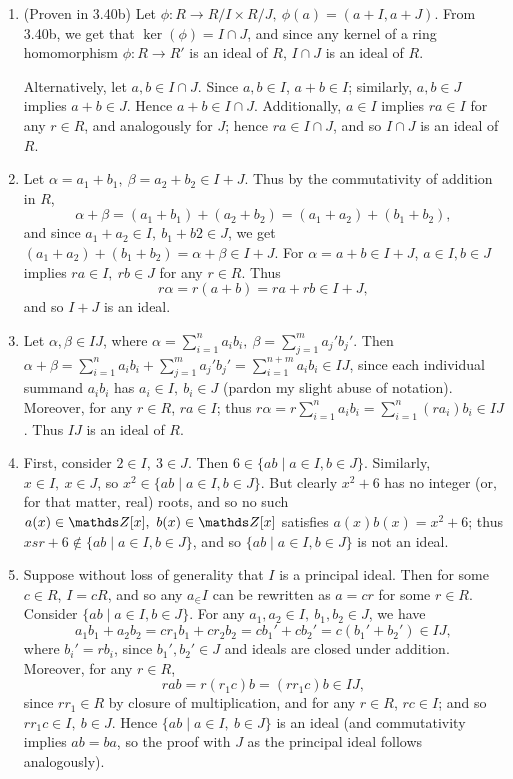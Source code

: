\documentclass{homework}
\begin{document}
\begin{solution}
  \begin{enumerate}[label=(\alph*)]
    \item (Proven in 3.40b) Let $\phi:R\to R / I \times  R / J,\ \phi(a)=(a+I,a+J)$. From 3.40b, we
      get that $\ker(\phi)=I\cap J$, and since any kernel of a ring homomorphism $\phi:R\to R'$ is
      an ideal of $R$, $I\cap J$ is an ideal of $R$.

      Alternatively, let $a,b\in I\cap J$. Since $a,b\in I$, $a+b\in I$; similarly, $a,b\in J$
      implies $a+b\in J$. Hence $a+b\in I\cap J$. Additionally, $a\in I$ implies $ra\in I$ for any
      $r\in R$, and analogously for $J$; hence $ra\in I\cap J$, and so $I\cap J$ is an ideal of $R$.

    \item Let $\alpha=a_1+b_1,\ \beta=a_2+b_2\in I+J$. Thus by the commutativity of addition in $R$,
      \[
        \alpha+\beta=(a_1+b_1)+(a_2+b_2)=(a_1+a_2)+(b_1+b_2)
      ,\] and since $a_1+a_2\in I,\ b_1+b2\in J$, we get $(a_1+a_2)+(b_1+b_2)=\alpha+\beta\in I+J$.
      For $\alpha=a+b\in I+J$, $a\in I, b\in J$ implies $ra\in I,\ rb\in J$ for any $r\in R$. Thus \[
        r\alpha=r(a+b)=ra+rb\in I+J
      ,\] and so $I+J$ is an ideal.

    \item Let $\alpha,\beta\in IJ$, where $\alpha=\sum_{i=1}^{n} a_ib_i,\ \beta=\sum_{j=1}^{m}
      a_j'b_j'$. Then $\alpha+\beta=\sum_{i=1}^{n} a_ib_i+\sum_{j=1}^{m}a_j'b_j'=\sum_{i=1}^{n+m}
      a_ib_i\in IJ$, since each individual summand $a_ib_i$ has $a_i\in I,\ b_i\in J$ (pardon my
      slight abuse of notation). Moreover, for any $r\in R$, $ra\in I$; thus $r\alpha=r
      \sum_{i=1}^{n} a_ib_i=\sum_{i=1}^{n} (ra_i)b_i\in IJ$. Thus $IJ$ is an ideal of $R$.
    \item First, consider $2\in I,\ 3\in J$. Then $6\in \{ab\mid a\in I,b\in J\}$. Similarly, $x\in
      I,\ x\in J$, so $x^2\in \{ab\mid a\in I,b\in J\}$. But clearly $x^2+6$ has no integer (or, for
      that matter, real) roots, and so no such $a(x)\in \Z[x],\ b(x)\in \Z[x]$ satisfies
      $a(x)b(x)=x^2+6$; thus $xsr+6\not\in \{ab\mid a\in I,b\in J\} $, and so $\{ab\mid a\in I,b\in
      J\} $ is not an ideal.
    \item Suppose without loss of generality that $I$ is a principal ideal. Then for some $c\in R$,
      $I=cR$, and so any $a_\in I$ can be rewritten as $a=cr$ for some $r\in R$. Consider $\{ab\mid
      a\in I, b\in J\} $. For any $a_1,a_2\in I,\ b_1,b_2\in J$, we have \[
        a_1b_1+a_2b_2=cr_1b_1+cr_2b_2=c b_1'+c b_2'=c(b_1'+b_2')\in IJ
      ,\] where $b_i'=rb_i$, since $b_1',b_2'\in J$ and ideals are closed under addition. Moreover,
      for any $r\in R$, \[
        rab=r(r_1c)b=(rr_1c)b\in IJ
      ,\]  since $rr_1\in R$ by closure of multiplication, and for any $r\in R$, $rc\in I$; and so
      $rr_1c\in I,\ b\in J$. Hence $\{ab\mid a\in I,\ b\in J\} $ is an ideal (and commutativity
      implies $ab=ba$, so the proof with $J$ as the principal ideal follows analogously).
  \end{enumerate}
\end{solution}
\end{document}

